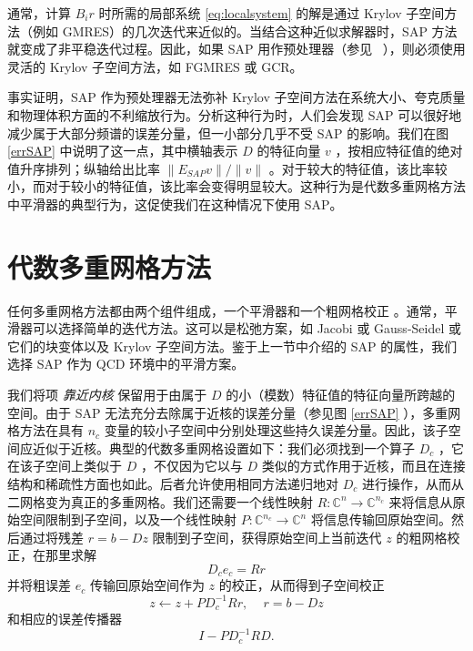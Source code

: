 \documentclass{siamltex}
\newcommand{\ESAP}{E_\mathit{SAP}}
\begin{document}
通常，计算    $B_ir$    时所需的局部系统    \eqref{eq:localsystem}    的解是通过 Krylov 子空间方法（例如 GMRES）的几次迭代来近似的。当结合这种近似求解器时，SAP 方法就变成了非平稳迭代过程。因此，如果 SAP 用作预处理器（参见~    \cite{Nobile2012, Luescher2003, Saad:2003:IMS:829576}    ），则必须使用灵活的 Krylov 子空间方法，如 FGMRES 或 GCR。

事实证明，SAP 作为预处理器无法弥补 Krylov 子空间方法在系统大小、夸克质量和物理体积方面的不利缩放行为。分析这种行为时，人们会发现 SAP 可以很好地减少属于大部分频谱的误差分量，但一小部分几乎不受 SAP 的影响。我们在图    \ref{errSAP}    中说明了这一点，其中横轴表示    $D$    的特征向量    $v$   ，按相应特征值的绝对值升序排列；纵轴给出比率    $\|\ESAP v\|/\|v\|$    。对于较大的特征值，该比率较小，而对于较小的特征值，该比率会变得明显较大。这种行为是代数多重网格方法中平滑器的典型行为，这促使我们在这种情况下使用 SAP。
\section{代数多重网格方法  }       \label{section:AMG}    任何多重网格方法都由两个组件组成，一个平滑器和一个粗网格校正    \cite{Brezina2005,hackbusch2003multi,RugeStueben87,UTrottenberg_etal_2001}    。通常，平滑器可以选择简单的迭代方法。这可以是松弛方案，如 Jacobi 或 Gauss-Seidel 或它们的块变体以及 Krylov 子空间方法。鉴于上一节中介绍的 SAP 的属性，我们选择 SAP 作为 QCD 环境中的平滑方案。

我们将项  {    \em    靠近内核   }  保留用于由属于    $D$    的小（模数）特征值的特征向量所跨越的空间。由于 SAP 无法充分去除属于近核的误差分量（参见图    \ref{errSAP}   ），多重网格方法在具有    $n_c$    变量的较小子空间中分别处理这些持久误差分量。因此，该子空间应近似于近核。典型的代数多重网格设置如下：我们必须找到一个算子    $D_c$   ，它在该子空间上类似于    $D$   ，不仅因为它以与    $D$    类似的方式作用于近核，而且在连接结构和稀疏性方面也如此。后者允许使用相同方法递归地对    $D_c$    进行操作，从而从二网格变为真正的多重网格。我们还需要一个线性映射    $R: \mathbb{C}^{n} \rightarrow \mathbb{C}^{n_c}$    来将信息从原始空间限制到子空间，以及一个线性映射    $P: \mathbb{C}^{n_c} \rightarrow \mathbb{C}^{n}$    将信息传输回原始空间。然后通过将残差    $r= b-Dz$    限制到子空间，获得原始空间上当前迭代    $z$    的粗网格校正，在那里求解
\begin{equation} \label{coarse_eq}
  D_c e_c = Rr
\end{equation}    并将粗误差    $e_c$    传输回原始空间作为    $z$    的校正，从而得到子空间校正
\begin{equation} \label{coarse_grid_correction}
  z \leftarrow z + P D_c^{-1} R r, \, \quad r=b-Dz
\end{equation}    和相应的误差传播器
$$
  I - P D_c^{-1} R D.
$$
\end{document}
